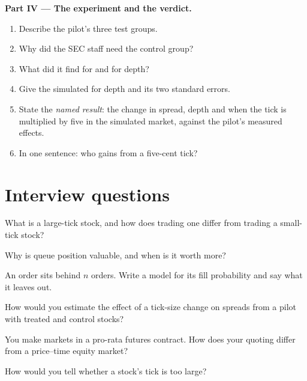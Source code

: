 \begin{problem}
\medskip\noindent\textbf{Part IV --- The experiment and the verdict.}
\begin{enumerate}[resume]
\item Describe the pilot's three test groups.
\item Why did the SEC staff need the control group?
\item What did it find for  and for depth?
\item Give the simulated  for depth and its two standard errors.
\item State the \emph{named result}: the change in spread, depth and  when the tick is multiplied by five in the simulated market, against the
pilot's measured effects.
\item In one sentence: who gains from a five-cent tick?
\end{enumerate}
\end{problem}

\section{Interview questions}

\begin{interviewq}\label{iq:mx:tick-size-queues-and-priority:1}
What is a large-tick stock, and how does trading one differ from trading a small-tick stock?
\end{interviewq}

\begin{interviewq}\label{iq:mx:tick-size-queues-and-priority:2}
Why is queue position valuable, and when is it worth more?
\end{interviewq}

\begin{interviewq}\label{iq:mx:tick-size-queues-and-priority:3}
An order sits behind $n$ orders. Write a model for its fill probability and say what it leaves out.
\end{interviewq}

\begin{interviewq}\label{iq:mx:tick-size-queues-and-priority:4}
How would you estimate the effect of a tick-size change on spreads from a pilot with treated and control stocks?
\end{interviewq}

\begin{interviewq}\label{iq:mx:tick-size-queues-and-priority:5}
You make markets in a pro-rata futures contract. How does your quoting differ from a price--time equity market?
\end{interviewq}

\begin{interviewq}\label{iq:mx:tick-size-queues-and-priority:6}
How would you tell whether a stock's tick is too large?
\end{interviewq}
